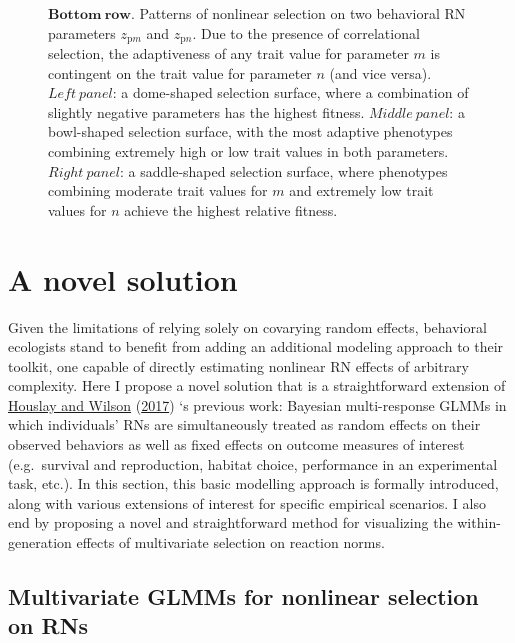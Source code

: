 \documentclass{article}
\begin{document}
\begin{figure}
{$\boldsymbol{Bottom \ row}$. Patterns of nonlinear selection on two behavioral RN parameters ${z_{\mathrm{p}m}}$ and ${z_{\mathrm{p}n}}$. Due to the presence of correlational selection, the adaptiveness of any trait value for parameter $m$ is contingent on the trait value for parameter $n$ (and vice versa). $Left \ panel$: a dome-shaped selection surface, where a combination of slightly negative parameters has the highest fitness. $Middle \ panel$: a bowl-shaped selection surface, with the most adaptive phenotypes combining extremely high or low trait values in both parameters. $Right \ panel$: a saddle-shaped selection surface, where phenotypes combining moderate trait values for $m$ and extremely low trait values for $n$ achieve the highest relative fitness.
}
\label{fig:fig2}
\end{figure}

\hypertarget{a-novel-solution}{%
\section{A novel solution}\label{a-novel-solution}}

Given the limitations of relying solely on covarying random effects,
behavioral ecologists stand to benefit from adding an additional
modeling approach to their toolkit, one capable of directly estimating
nonlinear RN effects of arbitrary complexity. Here I propose a novel
solution that is a straightforward extension of
\protect\hyperlink{ref-Hous2017}{Houslay and Wilson}
(\protect\hyperlink{ref-Hous2017}{2017}) `s previous work: Bayesian
multi-response GLMMs in which individuals' RNs are simultaneously
treated as random effects on their observed behaviors as well as fixed
effects on outcome measures of interest (e.g.~survival and reproduction,
habitat choice, performance in an experimental task, etc.). In this
section, this basic modelling approach is formally introduced, along
with various extensions of interest for specific empirical scenarios. I
also end by proposing a novel and straightforward method for visualizing
the within-generation effects of multivariate selection on reaction
norms.

\hypertarget{multivariate-glmms-for-nonlinear-selection-on-rns}{%
\subsection{Multivariate GLMMs for nonlinear selection on
RNs}\label{multivariate-glmms-for-nonlinear-selection-on-rns}}
\end{document}
